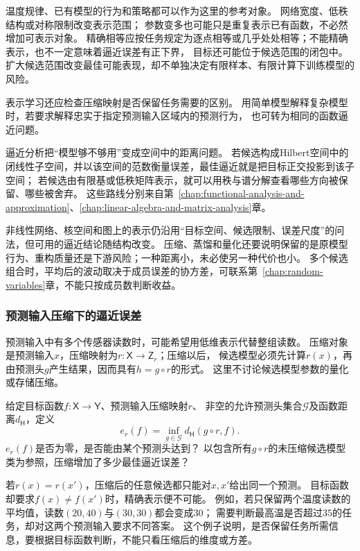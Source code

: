 温度规律、已有模型的行为和策略都可以作为这里的参考对象。
网络宽度、低秩结构或对称限制改变表示范围；
参数变多也可能只是重复表示已有函数，不必然增加可表示对象。
精确相等应按任务规定为逐点相等或几乎处处相等；不能精确表示，也不一定意味着逼近误差有正下界，
目标还可能位于候选范围的闭包中。扩大候选范围改变最佳可能表现，却不单独决定有限样本、有限计算下训练模型的风险。

表示学习还应检查压缩映射是否保留任务需要的区别。
用简单模型解释复杂模型时，若要求解释忠实于指定预测输入区域内的预测行为，
也可转为相同的函数逼近问题。

逼近分析把“模型够不够用”变成空间中的距离问题。
若候选构成Hilbert空间中的闭线性子空间，并以该空间的范数衡量误差，最佳逼近就是把目标正交投影到该子空间；
若候选由有限基或低秩矩阵表示，就可以用秩与谱分解查看哪些方向被保留、哪些被舍弃。
这些路线分别来自第~\ref{chap:functional-analysis-and-approximation}、\ref{chap:linear-algebra-and-matrix-analysis}章。

非线性网络、核空间和图上的表示仍沿用“目标空间、候选限制、误差尺度”的问法，但可用的逼近结论随结构改变。
压缩、蒸馏和量化还要说明保留的是原模型行为、重构质量还是下游风险；一种距离小，未必使另一种代价也小。
多个候选组合时，平均后的波动取决于成员误差的协方差，可联系第~\ref{chap:random-variables}章，不能只按成员数判断收益。

\subsubsection{预测输入压缩下的逼近误差}
\label{sec:future-analysis-input-compression}

预测输入中有多个传感器读数时，可能希望用低维表示代替整组读数。
压缩对象是预测输入$x$，压缩映射为$r:\mathsf X\to\mathsf Z_r$；压缩以后，
候选模型必须先计算$r(x)$，再由预测头$g$产生结果，因而具有$h=g\circ r$的形式。
这里不讨论候选模型参数的量化或存储压缩。

\begin{mathproblem}[预测输入压缩造成的最佳逼近误差]
  \label{question:future-input-compression}
  给定目标函数$f:\mathsf X\to\mathsf Y$、预测输入压缩映射$r$、
  非空的允许预测头集合$\mathcal G$及函数距离$d_{\mathsf H}$，定义
  \[
    e_r(f)=\inf_{g\in\mathcal G}d_{\mathsf H}(g\circ r,f).
  \]
  $e_r(f)$是否为零，是否能由某个预测头达到？
  以包含所有$g\circ r$的未压缩候选模型类为参照，压缩增加了多少最佳逼近误差？
\end{mathproblem}

若$r(x)=r(x')$，压缩后的任意候选都只能对$x,x'$给出同一个预测。
目标函数却要求$f(x)\ne f(x')$时，精确表示便不可能。
例如，若只保留两个温度读数的平均值，读数$(20,40)$与$(30,30)$都会变成$30$；
需要判断最高温是否超过$35$的任务，却对这两个预测输入要求不同答案。
这个例子说明，是否保留任务所需信息，要根据目标函数判断，不能只看压缩后的维度或方差。


